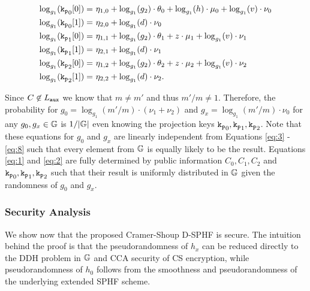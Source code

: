 \begin{align}
	\log_{g_1}(\mathtt{k_p}_0[0]) =&~ \eta_{1,0} + \log_{g_1}(g_2)\cdot\theta_{0} + \log_{g_1}(h)\cdot\mu_{0} + \log_{g_1}(v)\cdot\nu_{0} \label{eq:3}\\
	\log_{g_1}(\mathtt{k_p}_0[1]) =&~ \eta_{2,0} + \log_{g_1}(d)\cdot\nu_{0} \label{eq:4}\\
	\log_{g_1}(\mathtt{k_p}_1[0]) =&~ \eta_{1,1} + \log_{g_1}(g_2)\cdot\theta_{1} + z\cdot\mu_{1} + \log_{g_1}(v)\cdot\nu_{1} \label{eq:5}\\
	\log_{g_1}(\mathtt{k_p}_1[1]) =&~ \eta_{2,1} + \log_{g_1}(d)\cdot\nu_{1} \label{eq:6}\\
	\log_{g_1}(\mathtt{k_p}_2[0]) =&~ \eta_{1,2} + \log_{g_1}(g_2)\cdot\theta_{2} + z\cdot\mu_{2} + \log_{g_1}(v)\cdot\nu_{2} \label{eq:7}\\
	\log_{g_1}(\mathtt{k_p}_2[1]) =&~ \eta_{2,2} + \log_{g_1}(d)\cdot\nu_{2}. \label{eq:8}
\end{align}

\noindent
Since $C\not\in L_\mathtt{aux}$ we know that $m\not=m'$ and thus $m'/m\not=1$.
Therefore, the probability for $g_0=\log_{g_1}(m'/m)\cdot (\nu_1+\nu_2)$ and $g_x=\log_{g_1}(m'/m)\cdot \nu_0$ for any $g_0,g_x\in\mathbb{G}$ is $1/|\mathbb{G}|$ even knowing the projection keys $\mathtt{k_p}_0,\mathtt{k_p}_1,\mathtt{k_p}_2$.
Note that these equations for $g_0$ and $g_x$ are linearly independent from Equations \ref{eq:3} - \ref{eq:8} such that every element from $\mathbb{G}$ is equally likely to be the result.
Equations \ref{eq:1} and \ref{eq:2} are fully determined by public information $C_0,C_1,C_2$ and $\mathtt{k_p}_0,\mathtt{k_p}_1,\mathtt{k_p}_2$ such that their result is uniformly distributed in $\mathbb{G}$ given the randomness of $g_0$ and $g_x$.

\subsubsection{Security Analysis}
We show now that the proposed Cramer-Shoup \ac{D-SPHF} is secure.
The intuition behind the proof is that the pseudorandomness of $h_x$ can be reduced directly to the \ac{DDH} problem in $\mathbb{G}$ and \ac{CCA} security of \ac{CS} encryption, while pseudorandomness of $h_0$ follows from the smoothness and pseudorandomness of the underlying extended \ac{SPHF} scheme.

